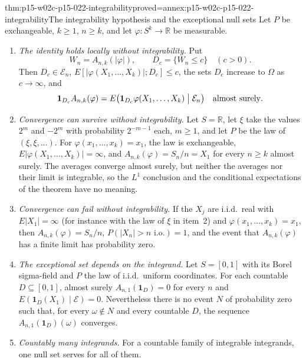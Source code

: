 \begin{hbtheorem}{thm:p15-w02c-p15-022-integrability}{proved=annex:p15-w02c-p15-022-integrability}{The integrability hypothesis and the exceptional null sets}
Let \(P\) be exchangeable, \(k\geq1\), \(n\geq k\), and let
\(\varphi:S^k\to\mathbb R\) be measurable.
\begin{enumerate}
\item \emph{The identity holds locally without integrability.} Put
      \[
       W_n=A_{n,k}(|\varphi|),\qquad D_c=\{W_n\leq c\}\quad(c>0).
      \]
      Then \(D_c\in\mathcal E_n\),
      \(E[|\varphi(X_1,\ldots,X_k)|;D_c]\leq c\), the sets \(D_c\)
      increase to \(\Omega\) as \(c\to\infty\), and
      \[
       \mathbf1_{D_c}A_{n,k}(\varphi)
          =E\bigl(\mathbf1_{D_c}\varphi(X_1,\ldots,X_k)\bigm|\mathcal E_n\bigr)
          \quad\text{almost surely}.
      \]
\item \emph{Convergence can survive without integrability.} Let
      \(S=\mathbb R\), let \(\xi\) take the values \(2^m\) and \(-2^m\)
      with probability \(2^{-m-1}\) each, \(m\geq1\), and let \(P\) be
      the law of \((\xi,\xi,\ldots)\). For
      \(\varphi(x_1,\ldots,x_k)=x_1\), the law is exchangeable,
      \(E|\varphi(X_1,\ldots,X_k)|=\infty\), and
      \(A_{n,k}(\varphi)=S_n/n=X_1\) for every \(n\geq k\) almost
      surely. The averages converge almost surely, but neither the averages nor
      their limit is integrable, so the \(L^1\) conclusion and the
      conditional expectations of the theorem have no meaning.
\item \emph{Convergence can fail without integrability.} If the
      \(X_j\) are i.i.d.\ real with \(E|X_1|=\infty\) (for instance with
      the law of \(\xi\) in item~2) and
      \(\varphi(x_1,\ldots,x_k)=x_1\), then
      \(A_{n,k}(\varphi)=S_n/n\), \(P(|X_n|>n\text{ i.o.})=1\), and the
      event that \(A_{n,k}(\varphi)\) has a finite limit has probability
      zero.
\item \emph{The exceptional set depends on the integrand.} Let
      \(S=[0,1]\) with its Borel sigma-field and \(P\) the law of i.i.d.\
      uniform coordinates. For each countable \(D\subseteq[0,1]\),
      almost surely \(A_{n,1}(\mathbf1_D)=0\) for every \(n\) and
      \(E(\mathbf1_D(X_1)\mid\mathcal E)=0\). Nevertheless there is no
      event \(N\) of probability zero such that, for every
      \(\omega\notin N\) and every countable \(D\), the sequence
      \(A_{n,1}(\mathbf1_D)(\omega)\) converges.
\item \emph{Countably many integrands.} For a countable family of
      integrable integrands, one null set serves for all of them.
\end{enumerate}
\end{hbtheorem}

